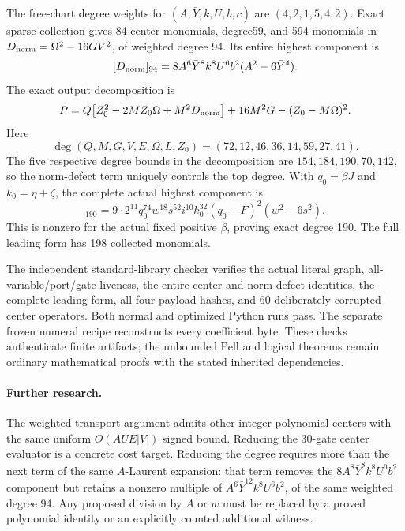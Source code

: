 The free-chart degree weights for $(A,\bar Y,k,U,b,c)$ are
$(4,2,1,5,4,2)$. Exact sparse collection gives 84 center monomials, degree59,
and 594 monomials in
$D_{\rm norm}=\Omega^2-16GV^2$, of weighted degree 94. Its entire highest
component is
\[
 [D_{\rm norm}]_{94}
 =8A^6\bar Y^8k^8U^6b^2(A^2-6\bar Y^4).
\]
The exact output decomposition is
\[
 P=Q\bigl[Z_0^2-2MZ_0\Omega+M^2D_{\rm norm}\bigr]
      +16M^2G-(Z_0-M\Omega)^2.
\]
Here
\[
 \deg(Q,M,G,V,E,\Omega,L,Z_0)=(72,12,46,36,14,59,27,41).
\]
The five respective degree bounds in the decomposition are
$154,184,190,70,142$, so the norm-defect term uniquely controls the top
degree. With $q_0=\beta J$ and $k_0=\eta+\zeta$, the complete actual
highest component is
\begin{equation}
 [P]_{190}
 =9\cdot2^{11}q_0^{74}w^{18}s^{52}i^{10}k_0^{32}
       (q_0-F)^2(w^2-6s^2).
 \label{eq:positive190-leading}
\end{equation}
This is nonzero for the actual fixed positive $\beta$, proving exact degree 190.
The full leading form has 198 collected monomials.

The independent standard-library checker verifies the actual literal graph,
all-variable/port/gate liveness, the entire center and norm-defect identities,
the complete leading form, all four payload hashes, and 60 deliberately
corrupted center operators. Both normal and optimized Python runs pass.
The separate frozen numeral recipe reconstructs every coefficient byte.
These checks authenticate finite artifacts; the unbounded Pell and logical
theorems remain ordinary mathematical proofs with the stated inherited
dependencies.

\paragraph{Further research.}
The weighted transport argument admits other integer polynomial centers with
the same uniform $O(AUE|V|)$ signed bound. Reducing the 30-gate center
evaluator is a concrete cost target. Reducing the degree requires more than
the next term of the same $A$-Laurent expansion: that term removes the
$8A^8\bar Y^8k^8U^6b^2$ component but retains a nonzero multiple of
$A^6\bar Y^{12}k^8U^6b^2$, of the same weighted degree 94. Any proposed
division by $A$ or $w$ must be replaced by a proved polynomial identity or
an explicitly counted additional witness.
